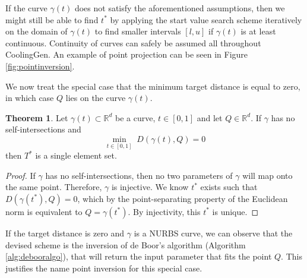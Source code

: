 \documentclass[a4paper, 11pt]{report}
\theoremstyle{definition}
\newtheorem{theorem}[definition]{Theorem}
\begin{document}
	If the curve $\gamma(t)$ does not satisfy the aforementioned assumptions, then we might still be able to find $t^*$ by applying the start value search scheme iteratively on the domain of $\gamma(t)$ to find smaller intervals $[l,u]$ if $\gamma(t)$ is at least continuous. Continuity of curves can safely be assumed all throughout CoolingGen. An example of point projection can be seen in Figure \ref{fig:pointinversion}.

	We now treat the special case that the minimum target distance is equal to zero, in which case $Q$ lies on the curve $\gamma(t)$.
	\begin{theorem}
		Let $\gamma(t) \subset \mathbb{R}^d$ be a curve, $t \in [0,1]$ and let $Q \in \mathbb{R}^d$. If $\gamma$ has no self-intersections and
			$$\underset{t\in[0,1]}{\min} \; D(\gamma(t), Q) = 0$$
		then $T^*$ is a single element set.
	\end{theorem}
	\begin{proof}
		If $\gamma$ has no self-intersections, then no two parameters of $\gamma$ will map onto the same point. Therefore, $\gamma$ is injective. We know $t^*$ exists such that $D(\gamma(t^*), Q) = 0$, which by the point-separating property of the Euclidean norm is equivalent to $Q = \gamma(t^*)$. By injectivity, this $t^*$ is unique.
	\end{proof}

	If the target distance is zero and $\gamma$ is a NURBS curve, we can observe that the devised scheme is the inversion of de Boor's algorithm (Algorithm \ref{alg:debooralgo}), that will return the input parameter that fits the point $Q$. This justifies the name point inversion for this special case.
\end{document}
